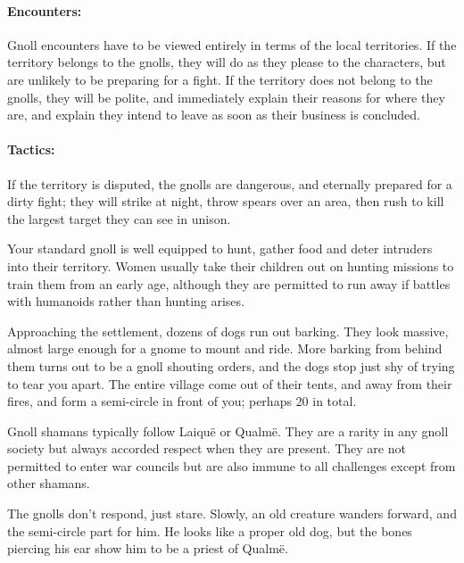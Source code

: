 \begin{multicols}{2}
\paragraph{Encounters:} Gnoll encounters have to be viewed entirely in terms of the local territories.
If the territory belongs to the gnolls, they will do as they please to the characters, but are unlikely to be preparing for a fight.
If the territory does not belong to the gnolls, they will be polite, and immediately explain their reasons for where they are, and explain they intend to leave as soon as their business is concluded.
\paragraph{Tactics:}
If the territory is disputed, the gnolls are dangerous, and eternally prepared for a dirty fight; they will strike at night, throw spears over an area, then rush to kill the largest target they can see in unison.

Your standard gnoll is well equipped to hunt, gather food and deter intruders into their territory.
Women usually take their children out on hunting missions to train them from an early age, although they are permitted to run away if battles with humanoids rather than hunting arises.

\begin{boxtext}

  Approaching the settlement, dozens of dogs run out barking.
  They look massive, almost large enough for a gnome to mount and ride.
  More barking from behind them turns out to be a gnoll shouting orders, and the dogs stop just shy of trying to tear you apart.
  The entire village come out of their tents, and away from their fires, and form a semi-circle in front of you; perhaps 20 in total.

\end{boxtext}

\label{gnoll_shaman}

Gnoll shamans typically follow Laiqu\"{e} or Qualm\"{e}.  They are a rarity in any gnoll society but always accorded respect when they are present.  They are not permitted to enter war councils but are also immune to all challenges except from other shamans.


\begin{boxtext}

  The gnolls don't respond, just stare.  
  Slowly, an old creature wanders forward, and the semi-circle part for him.
  He looks like a proper old dog, but the bones piercing his ear show him to be a priest of Qualm\"{e}.


\end{boxtext}
\end{multicols}
